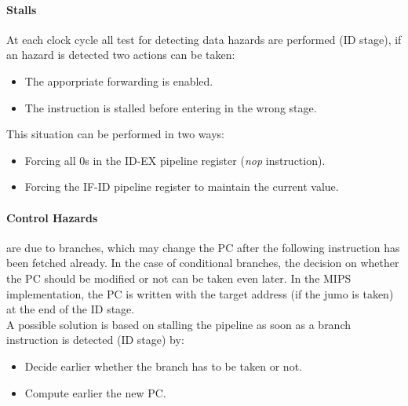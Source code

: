 \documentclass[12pt]{article}
\begin{document}
\paragraph{Stalls} At each clock cycle all test for detecting data hazards are performed (ID stage), if an hazard is detected two actions can be taken:
\begin{itemize}
  \item The apporpriate forwarding is enabled.
  \item The instruction is stalled before entering in the wrong stage.
\end{itemize}
This situation can be performed in two ways:
\begin{itemize}
  \item Forcing all 0s in the ID-EX pipeline register (\textit{nop} instruction).
  \item Forcing the IF-ID pipeline register to maintain the current value.
\end{itemize}

\paragraph{Control Hazards} are due to branches, which may change the PC after the following instruction has been fetched already. In the case of conditional branches, the decision on whether the PC should be modified or not can be taken even later. In the MIPS implementation, the PC is written with the target address (if the jumo is taken) at the end of the ID stage.\\
A possible solution is based on stalling the pipeline as soon as a branch instruction is detected (ID stage) by:
\begin{itemize}
  \item Decide earlier whether the branch has to be taken or not.
  \item Compute earlier the new PC.
\end{itemize}
\end{document}
